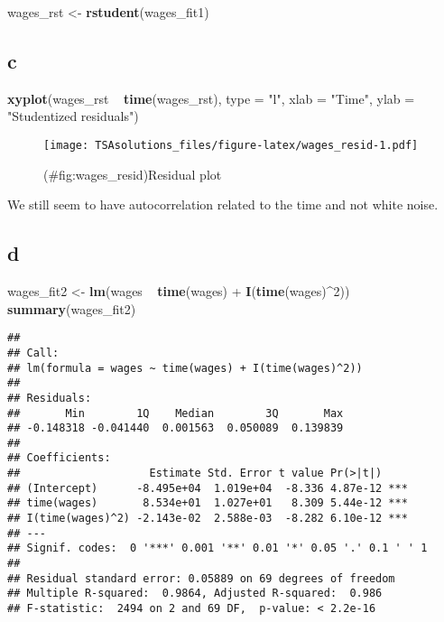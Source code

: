 \documentclass[]{book}
\newenvironment{Shaded}{\begin{snugshade}}{\end{snugshade}}
\newcommand{\KeywordTok}[1]{\textcolor[rgb]{0.13,0.29,0.53}{\textbf{{#1}}}}
\newcommand{\DataTypeTok}[1]{\textcolor[rgb]{0.13,0.29,0.53}{{#1}}}
\newcommand{\DecValTok}[1]{\textcolor[rgb]{0.00,0.00,0.81}{{#1}}}
\newcommand{\StringTok}[1]{\textcolor[rgb]{0.31,0.60,0.02}{{#1}}}
\newcommand{\NormalTok}[1]{{#1}}
\begin{document}
\begin{Shaded}
\begin{Highlighting}[]
\NormalTok{wages_rst <-}\StringTok{ }\KeywordTok{rstudent}\NormalTok{(wages_fit1)}
\end{Highlighting}
\end{Shaded}

\subsection*{c}\label{c-11}

\begin{Shaded}
\begin{Highlighting}[]
\KeywordTok{xyplot}\NormalTok{(wages_rst ~}\StringTok{ }\KeywordTok{time}\NormalTok{(wages_rst), }\DataTypeTok{type =} \StringTok{"l"}\NormalTok{,}
       \DataTypeTok{xlab =} \StringTok{"Time"}\NormalTok{, }\DataTypeTok{ylab =} \StringTok{"Studentized residuals"}\NormalTok{)}
\end{Highlighting}
\end{Shaded}

\begin{figure}[htbp]
\centering
\texttt{[image: TSAsolutions\_files/figure-latex/wages\_resid-1.pdf]}
\caption{(\#fig:wages\_resid)Residual plot}
\end{figure}

We still seem to have autocorrelation related to the time and not white
noise.

\subsection*{d}\label{d-2}

\begin{Shaded}
\begin{Highlighting}[]
\NormalTok{wages_fit2 <-}\StringTok{ }\KeywordTok{lm}\NormalTok{(wages ~}\StringTok{ }\KeywordTok{time}\NormalTok{(wages) +}\StringTok{ }\KeywordTok{I}\NormalTok{(}\KeywordTok{time}\NormalTok{(wages)^}\DecValTok{2}\NormalTok{))}
\KeywordTok{summary}\NormalTok{(wages_fit2)}
\end{Highlighting}
\end{Shaded}

\begin{verbatim}
## 
## Call:
## lm(formula = wages ~ time(wages) + I(time(wages)^2))
## 
## Residuals:
##       Min        1Q    Median        3Q       Max 
## -0.148318 -0.041440  0.001563  0.050089  0.139839 
## 
## Coefficients:
##                    Estimate Std. Error t value Pr(>|t|)    
## (Intercept)      -8.495e+04  1.019e+04  -8.336 4.87e-12 ***
## time(wages)       8.534e+01  1.027e+01   8.309 5.44e-12 ***
## I(time(wages)^2) -2.143e-02  2.588e-03  -8.282 6.10e-12 ***
## ---
## Signif. codes:  0 '***' 0.001 '**' 0.01 '*' 0.05 '.' 0.1 ' ' 1
## 
## Residual standard error: 0.05889 on 69 degrees of freedom
## Multiple R-squared:  0.9864, Adjusted R-squared:  0.986 
## F-statistic:  2494 on 2 and 69 DF,  p-value: < 2.2e-16
\end{verbatim}
\end{document}
